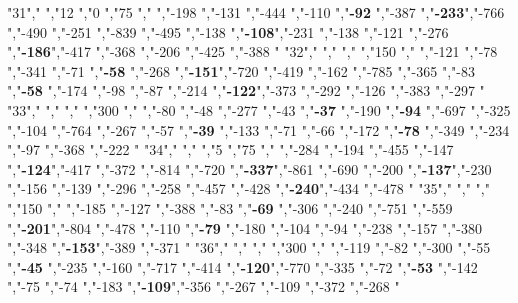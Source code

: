 "31","        ","12   ","0   ","75  ","     ","-198          ","-131          ","-444          ","-110          ","\textbf{-92} ","-387          ","\textbf{-233}","-766          ","-490          ","-251          ","-839          ","-495          ","-138          ","\textbf{-108}","-231          ","-138          ","-121          ","-276          ","\textbf{-186}","-417          ","-368          ","-206          ","-425          ","-388          "
"32","        ","     ","    ","150 ","     ","-121          ","-78           ","-341          ","-71           ","\textbf{-58} ","-268          ","\textbf{-151}","-720          ","-419          ","-162          ","-785          ","-365          ","-83           ","\textbf{-58} ","-174          ","-98           ","-87           ","-214          ","\textbf{-122}","-373          ","-292          ","-126          ","-383          ","-297          "
"33","        ","     ","    ","300 ","     ","-80           ","-48           ","-277          ","-43           ","\textbf{-37} ","-190          ","\textbf{-94} ","-697          ","-325          ","-104          ","-764          ","-267          ","-57           ","\textbf{-39} ","-133          ","-71           ","-66           ","-172          ","\textbf{-78} ","-349          ","-234          ","-97           ","-368          ","-222          "
"34","        ","     ","5   ","75  ","     ","-284          ","-194          ","-455          ","-147          ","\textbf{-124}","-417          ","-372          ","-814          ","-720          ","\textbf{-337}","-861          ","-690          ","-200          ","\textbf{-137}","-230          ","-156          ","-139          ","-296          ","-258          ","-457          ","-428          ","\textbf{-240}","-434          ","-478          "
"35","        ","     ","    ","150 ","     ","-185          ","-127          ","-388          ","-83           ","\textbf{-69} ","-306          ","-240          ","-751          ","-559          ","\textbf{-201}","-804          ","-478          ","-110          ","\textbf{-79} ","-180          ","-104          ","-94           ","-238          ","-157          ","-380          ","-348          ","\textbf{-153}","-389          ","-371          "
"36","        ","     ","    ","300 ","     ","-119          ","-82           ","-300          ","-55           ","\textbf{-45} ","-235          ","-160          ","-717          ","-414          ","\textbf{-120}","-770          ","-335          ","-72           ","\textbf{-53} ","-142          ","-75           ","-74           ","-183          ","\textbf{-109}","-356          ","-267          ","-109          ","-372          ","-268          "
